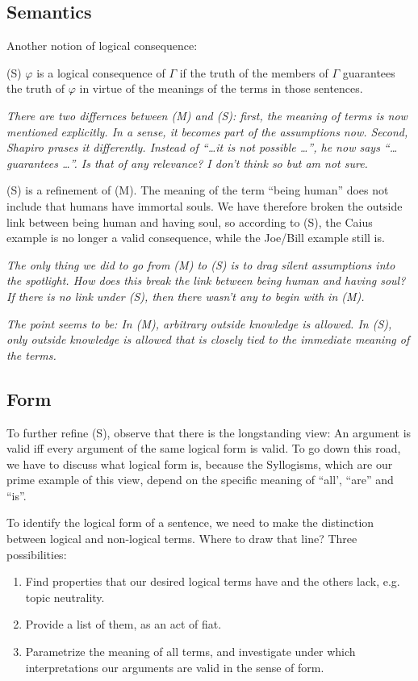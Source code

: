 \documentclass[a4paper]{article}
\begin{document}
\subsection{Semantics}

Another notion of logical consequence:

(S) $\varphi$ is a logical consequence of $\Gamma$ if the truth of the members
of $\Gamma$ guarantees the truth of $\varphi$ in virtue of the meanings of the
terms in those sentences.

\emph{There are two differnces between (M) and (S): first, the meaning of terms
is now mentioned explicitly.  In a sense, it becomes part of the assumptions
now.  Second, Shapiro prases it differently. Instead of ``\ldots it is not
possible \ldots'', he now says ``\ldots guarantees \ldots''.  Is that of any
relevance? I don't think so but am not sure.}

(S) is a refinement of (M).  The meaning of the term ``being human'' does not
include that humans have immortal souls.  We have therefore broken the outside
link between being human and having soul, so according to (S), the Caius example
is no longer a valid consequence, while the Joe/Bill example still is.

\emph{The only thing we did to go from (M) to (S) is to drag silent assumptions
into the spotlight.  How does this break the link between being human and having
soul? If there is no link under (S), then there wasn't any to begin with in
(M).}

\emph{The point seems to be: In (M), arbitrary outside knowledge is allowed. In
(S), only outside knowledge is allowed that is closely tied to the immediate
meaning of the terms.}

\subsection{Form}

To further refine (S), observe that there is the longstanding view:  An argument
is valid iff every argument of the same logical form is valid.  To go down this
road, we have to discuss what logical form is, because the Syllogisms, which are
our prime example of this view, depend on the specific meaning of ``all',
``are'' and ``is''.

To identify the logical form of a sentence, we need to make the distinction
between logical and non-logical terms.  Where to draw that line?  Three
possibilities:
\begin{enumerate}

  \item Find properties that our desired logical terms have and the others lack,
  e.g. topic neutrality.

  \item Provide a list of them, as an act of fiat.

  \item Parametrize the meaning of all terms, and investigate under which
  interpretations our arguments are valid in the sense of form.
\end{enumerate}
\end{document}
